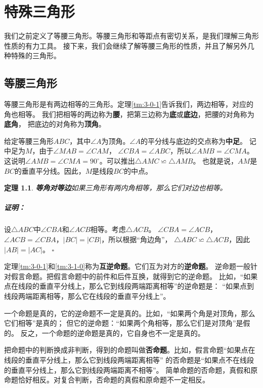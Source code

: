 \documentclass[12pt,UTF8]{ctexbook}
\newtheorem{tm}{定理}[section]
\newenvironment{proof2}{\paragraph{\textbf{证明：}}}{\hfill$\square$}
\begin{document}
\chapter{特殊三角形}
我们之前定义了等腰三角形。等腰三角形和等距点有密切关系，是我们理解三角形性质的有力工具。
接下来，我们会继续了解等腰三角形的性质，并且了解另外几种特殊的三角形。

\section{等腰三角形}
等腰三角形是有两边相等的三角形。定理\ref{tm:3-0-1}告诉我们，两边相等，对应的角也相等。
我们把相等的两边称为\textbf{腰}，把第三边称为\textbf{底}或\textbf{底边}，把腰的对角称为\textbf{底角}，
把底边的对角称为\textbf{顶角}。

给定等腰三角形$ABC$，其中$\angle A$为顶角。$\angle A$的平分线与底边的交点称为\textbf{中足}。
记中足为$M$，由于$\angle MAB = \angle CAM$，
$\angle CBA = \angle ABC$，所以$\angle AMB = \angle CMA$。
这说明$\angle AMB = \angle CMA = 90^\circ$。可以推出$\triangle AMC \backsimeq \triangle AMB$。
也就是说，$AM$是$BC$的垂直平分线。因此，$M$是线段$BC$的中点。

\begin{tm}{\textbf{等角对等边}}\label{tm:4-0-0}
    如果三角形有两内角相等，那么它们对边也相等。
\end{tm}
\begin{proof2}
    设$\triangle ABC$中$\angle CBA$和$\angle ACB$相等。考虑$\triangle ACB$。
    $\angle CBA = \angle ACB$，$\angle ACB = \angle CBA$，$|BC| = |CB|$，所以根据“角边角”，
    $\triangle ABC \backsimeq \triangle ACB$，因此$|AB| = |AC|$。
\end{proof2}

定理\ref{tm:3-0-1}和\ref{tm:3-1-0}称为\textbf{互逆命题}。它们互为对方的\textbf{逆命题}。
逆命题一般针对假言命题。把假言命题中的前件和后件互换，就得到它的逆命题。
比如，“如果点在线段的垂直平分线上，那么它到线段两端距离相等”的逆命题是：
“如果点到线段两端距离相等，那么它在线段的垂直平分线上”。

一个命题是真的，它的逆命题不一定是真的。比如，“如果两个角是对顶角，那么它们相等”是真的；
但它的逆命题：“如果两个角相等，那么它们是对顶角”是假的。
反之，一个命题的逆命题是真的，它自身也不一定是真的。

把命题中的判断换成非判断，得到的命题叫做\textbf{否命题}。比如，假言命题“如果点在线段的垂直平分线上，那么它到线段两端距离相等”
的否命题是“如果点不在线段的垂直平分线上，那么它到线段两端距离不相等”。
简单命题的否命题，真假和原命题恰好相反。对复合判断，否命题的真假和原命题不一定相反。
\end{document}
